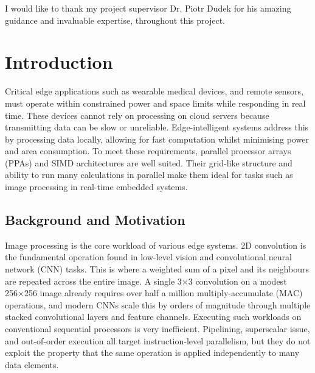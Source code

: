 \begin{uomacknowledgements}
I would like to thank my project supervisor Dr. Piotr Dudek for his amazing guidance and invaluable expertise, throughout this project.

\end{uomacknowledgements}



\uomstartmainbody %



\section{Introduction} %

        Critical edge applications such as wearable medical devices, and remote sensors, must operate within constrained power and space limits while responding in real time. These devices cannot rely on processing on cloud servers because transmitting data can be slow or unreliable. Edge-intelligent systems address this by processing data locally, allowing for fast computation whilst minimising power and area consumption. To meet these requirements, parallel processor arrays (PPAs) and SIMD architectures are well suited. Their grid-like structure and ability to run many calculations in parallel make them ideal for tasks such as image processing in real-time embedded systems.

    \subsection{Background and Motivation}
        Image processing is the core workload of various edge systems. 2D convolution is the fundamental operation found in low-level vision and convolutional neural network (CNN) tasks. This is where a weighted sum of a pixel and its neighbours are repeated across the entire image. A single 3×3 convolution on a modest 256×256 image already requires over half a million multiply-accumulate (MAC) operations, and modern CNNs scale this by orders of magnitude through multiple stacked convolutional layers and feature channels. Executing such workloads on conventional sequential processors is very inefficient. Pipelining, superscalar issue, and out-of-order execution all target instruction-level parallelism, but they do not exploit the property that the same operation is applied independently to many data elements.

